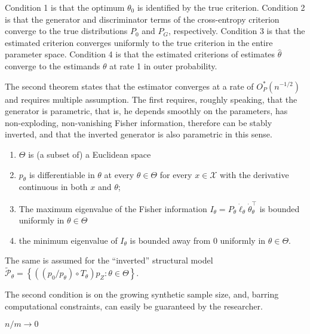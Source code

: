 Condition 1 is that the optimum $\theta_0$ is identified by the true criterion.
Condition 2 is that the generator and discriminator terms of the cross-entropy criterion converge to the true distributions $P_0$ and $P_G$, respectively. %
Condition 3 is that the estimated criterion converges uniformly to the true criterion in the entire parameter space.
Condition 4 is that the estimated criterions of estimates $\hat{\theta}$ converge to the estimands $\theta$ at rate 1 in outer probability. %

The second theorem states that the estimator converges at a rate of $O^{*}_P(n^{-1/2})$ and requires multiple assumption.
The first requires, roughly speaking, that the generator is parametric, that is, he depends smoothly on the parameters, has non-exploding, non-vanishing Fisher information, therefore can be stably inverted, and that the inverted generator is also parametric in this sense. %

\begin{assumption}[A1, KMP]
    \label{a:1}
    \begin{enumerate}
        \item $\Theta$ is (a subset of) a Euclidean space 
        \item $p_{\theta}$ is differentiable in $\theta$ at every $\theta \in \Theta$ for every $x \in \mathcal{X}$ with the derivative continuous in both $x$ and $\theta$; 
        \item The maximum eigenvalue of the Fisher information $I_{\theta}=P_{\theta} \dot{\ell}_{\theta} \dot{\theta}_{\theta}^{\top}$ is bounded uniformly in $\theta \in \Theta$ 
        \item the minimum eigenvalue of $I_{\theta}$ is bounded away from 0 uniformly in $\theta \in \Theta$.
    \end{enumerate}
    The same is assumed for the ``inverted'' structural model $\widetilde{\mathcal{P}}_{\theta}=\left\{\left(\left(p_{0} / p_{\theta}\right) \circ T_{\theta}\right) p_{Z}: \theta \in \Theta\right\}$.
\end{assumption}

The second condition is on the growing synthetic sample size, and, barring computational constraints, can easily be guaranteed by the researcher. %
\begin{assumption}[A2, KMP]
    \label{a:2}
    $n/m \rightarrow 0$
\end{assumption}

